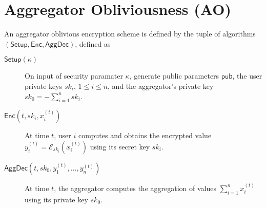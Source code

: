 \documentclass[twocolumn]{autart}
\begin{document}
\section{Aggregator Obliviousness (AO)} \label{app:ao}
An aggregator oblivious encryption scheme is defined by the tuple of algorithms $(\mathsf{Setup}, \mathsf{Enc}, \mathsf{AggDec})$, defined as
\begin{description}
    \item[$\mathsf{Setup}(\kappa)$] On input of security paramater $\kappa$, generate public parameters $\mathsf{pub}$, the user private keys $sk_i,\,1\leq i \leq n$, and the aggregator's private key $sk_0=-\sum^n_{i=1}sk_i$.
    \item[$\mathsf{Enc}(t, sk_i, x^{(t)}_i)$] At time $t$, user $i$ computes and obtains the encrypted value $y^{(t)}_i = \mathcal{E}_{sk_i}(x^{(t)}_i)$ using its secret key $sk_i$.
    \item[$\mathsf{AggDec}(t, sk_0, y^{(t)}_1,\dots,y^{(t)}_n)$] At time $t$, the aggregator computes the aggregation of values $\sum^{n}_{i=1} x^{(t)}_i$ using its private key $sk_0$.
\end{description}
\end{document}
